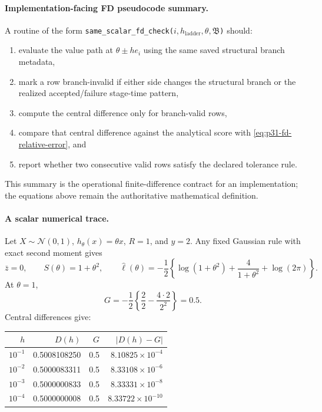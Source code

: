 \documentclass[11pt]{article}
\numberwithin{equation}{section}
\newcommand{\N}{\mathcal N}
\newcommand{\ellhat}{\widehat\ell}
\begin{document}
\paragraph{Implementation-facing FD pseudocode summary.}
A routine of the form \texttt{same\_scalar\_fd\_check(}$i,h_{\text{ladder}},\theta,\mathfrak B$\texttt{)}
should:
\begin{enumerate}[leftmargin=0.28in]
  \item evaluate the value path at \(\theta\pm he_i\) using the same saved
  structural branch metadata,
  \item mark a row branch-invalid if either side changes the structural branch
  or the realized accepted/failure stage-time pattern,
  \item compute the central difference only for branch-valid rows,
  \item compare that central difference against the analytical score with
  \eqref{eq:p31-fd-relative-error}, and
  \item report whether two consecutive valid rows satisfy the declared
  tolerance rule.
\end{enumerate}
This summary is the operational finite-difference contract for an
implementation; the equations above remain the authoritative mathematical
definition.

\paragraph{A scalar numerical trace.}
Let \(X\sim\N(0,1)\), \(h_\theta(x)=\theta x\), \(R=1\), and \(y=2\).  Any
fixed Gaussian rule with exact second moment gives
\begin{equation}
  \bar z=0,\qquad S(\theta)=1+\theta^2,\qquad
  \ellhat(\theta)
  =
  -\frac12\left\{\log(1+\theta^2)+\frac{4}{1+\theta^2}+\log(2\pi)\right\}.
  \label{eq:p31-fd-toy-likelihood}
\end{equation}
At \(\theta=1\),
\begin{equation}
  G
  =
  -\frac12
  \left\{
  \frac{2}{2}
  -
  \frac{4\cdot2}{2^2}
  \right\}
  =
  0.5.
  \label{eq:p31-fd-toy-gradient}
\end{equation}
Central differences give:
\begin{center}
\begin{tabular}{rrrr}
\toprule
\(h\) & \(D(h)\) & \(G\) & \(|D(h)-G|\) \\
\midrule
\(10^{-1}\) & 0.5008108250 & 0.5 & \(8.10825\times10^{-4}\) \\
\(10^{-2}\) & 0.5000083311 & 0.5 & \(8.33108\times10^{-6}\) \\
\(10^{-3}\) & 0.5000000833 & 0.5 & \(8.33331\times10^{-8}\) \\
\(10^{-4}\) & 0.5000000008 & 0.5 & \(8.33722\times10^{-10}\) \\
\bottomrule
\end{tabular}
\end{center}
\end{document}
